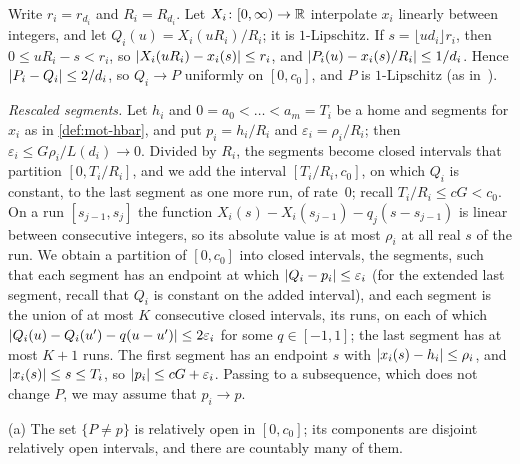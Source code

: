 \begin{informalproof}
Write $r_i=r_{d_i}$ and $R_i=R_{d_i}$. Let $X_i\colon[0,\infty)\to\mathbb{R}$ interpolate $x_i$ linearly between integers, and
let $Q_i(u)=X_i(uR_i)/R_i$; it is $1$-Lipschitz. If $s=\lfloor ud_i\rfloor r_i$, then $0\le uR_i-s<r_i$, so
$\lvert X_i(uR_i)-x_i(s) \rvert\le r_i$, and $\lvert P_i(u)-x_i(s)/R_i \rvert\le1/d_i$. Hence $\lvert P_i-Q_i \rvert\le2/d_i$, so $Q_i\to P$
uniformly on $[0,c_0]$, and $P$ is $1$-Lipschitz (as in~\cite[Lemma~7.1(a)]{FirstPaper2026}).

\emph{Rescaled segments.} Let $h_i$ and $0=a_0<\dots<a_m=T_i$ be a home and segments for $x_i$ as in
\cref{def:mot-hbar}, and put $p_i=h_i/R_i$ and $\varepsilon_i=\rho_i/R_i$; then $\varepsilon_i\le G\rho_i/L(d_i)\to0$.
Divided by $R_i$, the segments become closed intervals that partition $[0,T_i/R_i]$, and we add the interval
$[T_i/R_i,c_0]$, on which $Q_i$ is constant, to the last segment as one more run, of rate~$0$; recall
$T_i/R_i\le cG<c_0$. On a run $[s_{j-1},s_j]$ the function $X_i(s)-X_i(s_{j-1})-q_j(s-s_{j-1})$ is linear between
consecutive integers, so its absolute value is at most $\rho_i$ at all real $s$ of the run. We obtain a partition of
$[0,c_0]$ into closed intervals, the segments, such that each segment has an endpoint at which
$\lvert Q_i-p_i \rvert\le\varepsilon_i$ (for the extended last segment, recall that $Q_i$ is constant on the added interval),
and each segment is the union of at most $K$ consecutive closed intervals, its runs, on each of which
$\lvert Q_i(u)-Q_i(u')-q(u-u') \rvert\le2\varepsilon_i$ for some $q\in[-1,1]$; the last segment has at most $K+1$ runs. The
first segment has an endpoint $s$ with $\lvert x_i(s)-h_i \rvert\le\rho_i$, and $\lvert x_i(s) \rvert\le s\le T_i$, so
$\lvert p_i \rvert\le cG+\varepsilon_i$. Passing to a subsequence, which does not change $P$, we may assume that $p_i\to p$.

(a) The set $\{P\ne p\}$ is relatively open in $[0,c_0]$; its components are disjoint relatively open intervals, and
there are countably many of them.


\end{informalproof}

